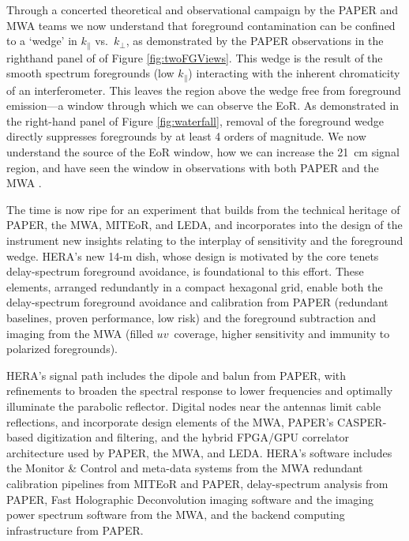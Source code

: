 \documentclass[preprint]{aastex}
\def\kperp{k_{\bot}}
\def\kpar{k_{\|}}
\def\kperp{k_{\bot}}
\def\kpar{k_{\|}}
\begin{document}
Through a concerted theoretical and observational campaign by the PAPER and MWA teams
\citep{morales_et_al2012,parsons_et_al2012b,vedantham_2012,Datta_2010,hazelton_et_al2013,pober_et_al2013,parsons_et_al2013,dillon_et_al2013b}
we now understand that foreground contamination can be confined to a `wedge' in
$\kpar$ vs.\ $\kperp$, as demonstrated by the PAPER observations in the
righthand panel of of Figure \ref{fig:twoFGViews}. 
This wedge is the result of
the smooth spectrum foregrounds 
(low $\kpar$) interacting with the inherent
chromaticity of an interferometer. 
This leaves the region above the wedge free from 
foreground emission---a window through which we can observe the EoR. 
As demonstrated in the right-hand panel of Figure \ref{fig:waterfall}, removal of the foreground wedge 
directly suppresses foregrounds by at least 4 orders of magnitude.
We now understand the source of the EoR window, how we can increase the 21~cm signal region, and have seen the window in observations with both PAPER and the MWA \citep{pober_et_al2013,dillon_et_al2013b}.

The time is now ripe for an experiment that builds from the technical heritage
of PAPER, the MWA, MITEoR, and LEDA, and incorporates into the design of the
instrument new insights relating to the interplay of sensitivity and the
foreground wedge.  HERA's new 14-m dish, whose design is motivated by the core
tenets delay-spectrum foreground avoidance, is foundational to this effort.
These elements, arranged redundantly in a compact hexagonal grid, enable both the
delay-spectrum foreground avoidance and calibration from PAPER (redundant
baselines, proven performance, low risk) and the foreground subtraction and
imaging from the MWA (filled $uv$~coverage, higher sensitivity and immunity to
polarized foregrounds).

HERA's signal path includes the dipole and balun from PAPER, with refinements
to broaden the spectral response to lower frequencies and optimally illuminate
the parabolic reflector.  Digital nodes near the antennas limit cable
reflections, and incorporate design elements of the MWA, PAPER's CASPER-based
digitization and filtering, and the hybrid FPGA/GPU correlator architecture
used by PAPER, the MWA, and LEDA.  HERA's software includes the Monitor \&
Control and meta-data systems from the MWA
redundant calibration pipelines from MITEoR and PAPER, delay-spectrum analysis from PAPER, Fast
Holographic Deconvolution imaging software
\citep{sullivan_et_al2012_trunc} and the imaging power spectrum
software from the MWA, and the backend computing infrastructure from PAPER.
\end{document}
